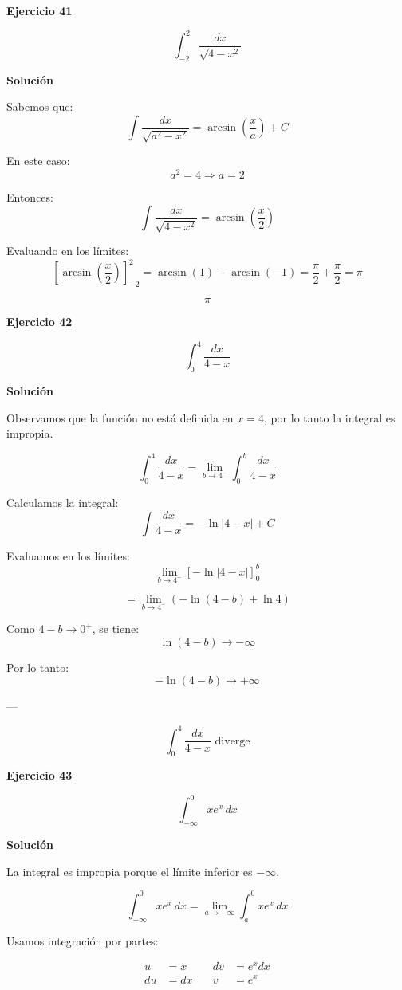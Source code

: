 \documentclass{article}
\begin{document}
\textbf{Ejercicio 41}

\[
\int_{-2}^{2} \frac{dx}{\sqrt{4 - x^2}}
\]

\textbf{Solución}

Sabemos que:
\[
\int \frac{dx}{\sqrt{a^2 - x^2}} = \arcsin\left(\frac{x}{a}\right) + C
\]

En este caso:
\[
a^2 = 4 \Rightarrow a = 2
\]

Entonces:
\[
\int \frac{dx}{\sqrt{4 - x^2}}
= \arcsin\left(\frac{x}{2}\right)
\]

Evaluando en los límites:
\[
\left[ \arcsin\left(\frac{x}{2}\right) \right]_{-2}^{2}
= \arcsin(1) - \arcsin(-1)
= \frac{\pi}{2} + \frac{\pi}{2}
= \pi
\]

\[
\boxed{\pi}
\]


\textbf{Ejercicio 42}

\[
\int_{0}^{4} \frac{dx}{4 - x}
\]

\textbf{Solución}

Observamos que la función no está definida en \(x = 4\), por lo tanto
la integral es impropia.

\[
\int_{0}^{4} \frac{dx}{4 - x}
= \lim_{b \to 4^-} \int_{0}^{b} \frac{dx}{4 - x}
\]

Calculamos la integral:
\[
\int \frac{dx}{4 - x} = -\ln|4 - x| + C
\]

Evaluamos en los límites:
\[
\lim_{b \to 4^-}
\left[ -\ln|4 - x| \right]_{0}^{b}
\]

\[
= \lim_{b \to 4^-}
\left( -\ln(4 - b) + \ln 4 \right)
\]

Como \(4 - b \to 0^+\), se tiene:
\[
\ln(4 - b) \to -\infty
\]

Por lo tanto:
\[
-\ln(4 - b) \to +\infty
\]

---

\[
\boxed{\int_{0}^{4} \frac{dx}{4 - x} \text{ diverge}}
\]

\textbf{Ejercicio 43}

\[
\int_{-\infty}^{0} x e^x \, dx
\]

\textbf{Solución}

La integral es impropia porque el límite inferior es \(-\infty\).

\[
\int_{-\infty}^{0} x e^x \, dx
= \lim_{a \to -\infty} \int_{a}^{0} x e^x \, dx
\]

Usamos integración por partes:

\[
\begin{aligned}
u &= x \quad & dv &= e^x dx \\
du &= dx \quad & v &= e^x
\end{aligned}
\]
\end{document}
